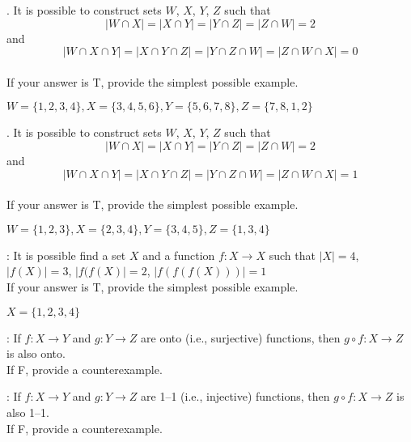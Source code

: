 \nextq
\tf. It is possible to construct sets $W$, $X$, $Y$, $Z$ such that
\[
|W \cap X| = |X \cap Y| = |Y \cap Z| = |Z \cap W| = 2
\]
and
\[
|W \cap X \cap Y| = |X \cap Y \cap Z| = |Y \cap Z \cap W| = |Z \cap W \cap X| = 0
\]
\dotfill{}
\\
If your answer is T, provide the simplest possible example.
\begin{answerlong}
    $W = \{1,2,3,4\}, X = \{3,4,5,6\}, Y = \{5,6,7,8\}, Z = \{7,8,1,2\}$
\end{answerlong}

\nextq
\tf. It is possible to construct sets $W$, $X$, $Y$, $Z$ such that
\[
|W \cap X| = |X \cap Y| = |Y \cap Z| = |Z \cap W| = 2
\]
and
\[
|W \cap X \cap Y| = |X \cap Y \cap Z| = |Y \cap Z \cap W| = |Z \cap W \cap X| = 1
\]
\dotfill{}
\\
If your answer is T, provide the simplest possible example.
\begin{answerlong}
    $W = \{1,2,3\}, X = \{2,3,4\}, Y = \{3,4,5\}, Z = \{1,3,4\}$
\end{answerlong}

\nextq
\tf: It is possible find a set $X$ and a function $f : X \rightarrow X$
such that $|X| = 4$, $|f(X)| = 3$, $|f(f(X)| = 2$, $|f(f(f(X)))| = 1$
\dotfill{}
\\
If your answer is T, provide the simplest possible example.
\begin{answerlong}
    $X = \{1,2,3,4\}$
\end{answerlong}

\nextq
\tf:
If $f : X \rightarrow Y$ and $g: Y \rightarrow Z$ are onto (i.e., surjective)
functions, then $g \circ f: X \rightarrow Z$ is also onto.
\dotfill{}
\\
If F, provide a counterexample.
\begin{answerlong}

\end{answerlong}

\nextq
\tf:
If $f : X \rightarrow Y$ and $g: Y \rightarrow Z$ are 1--1 
(i.e., injective)
functions, then $g \circ f: X \rightarrow Z$ is also 1--1.
\dotfill{}
\\
If F, provide a counterexample.
\begin{answerlong}

\end{answerlong}

